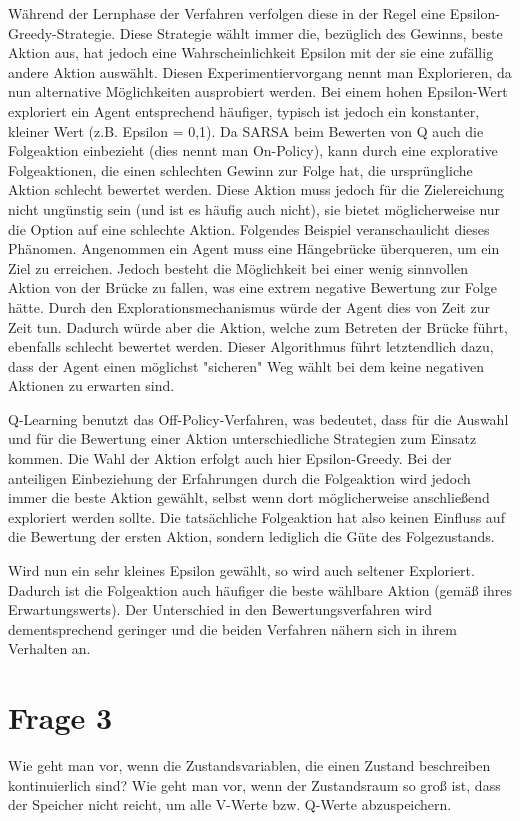 \documentclass[10pt]{scrartcl}
\begin{document}
Während der Lernphase der Verfahren verfolgen diese in der Regel eine Epsilon-Greedy-Strategie. Diese Strategie wählt immer die, bezüglich des Gewinns, beste Aktion aus, hat jedoch eine Wahrscheinlichkeit Epsilon mit der sie eine zufällig andere Aktion auswählt. Diesen Experimentiervorgang nennt man Explorieren, da nun alternative Möglichkeiten ausprobiert werden. Bei einem hohen Epsilon-Wert exploriert ein Agent entsprechend häufiger, typisch ist jedoch ein konstanter, kleiner Wert (z.B. Epsilon = 0,1).
Da SARSA beim Bewerten von Q auch die Folgeaktion einbezieht (dies nennt man On-Policy), kann durch eine explorative Folgeaktionen, die einen schlechten Gewinn zur Folge hat, die ursprüngliche Aktion schlecht bewertet werden. Diese Aktion muss jedoch für die Zielereichung nicht ungünstig sein (und ist es häufig auch nicht), sie bietet möglicherweise nur die Option auf eine schlechte Aktion. Folgendes Beispiel veranschaulicht dieses Phänomen. Angenommen ein Agent muss eine Hängebrücke überqueren, um ein Ziel zu erreichen. Jedoch besteht die Möglichkeit bei einer wenig sinnvollen Aktion von der Brücke zu fallen, was eine extrem negative Bewertung zur Folge hätte. Durch den Explorationsmechanismus würde der Agent dies von Zeit zur Zeit tun. Dadurch würde aber die Aktion, welche zum Betreten der Brücke führt, ebenfalls schlecht bewertet werden. Dieser Algorithmus führt letztendlich dazu, dass der Agent einen möglichst "sicheren" Weg wählt bei dem keine negativen Aktionen zu erwarten sind.

Q-Learning benutzt das Off-Policy-Verfahren, was bedeutet, dass für die Auswahl und für die Bewertung einer Aktion unterschiedliche Strategien zum Einsatz kommen. Die Wahl der Aktion erfolgt auch hier Epsilon-Greedy. Bei der anteiligen Einbeziehung der Erfahrungen durch die Folgeaktion wird jedoch immer die beste Aktion gewählt, selbst wenn dort möglicherweise anschließend exploriert werden sollte. Die tatsächliche Folgeaktion hat also keinen Einfluss auf die Bewertung der ersten Aktion, sondern lediglich die Güte des Folgezustands.

Wird nun ein sehr kleines Epsilon gewählt, so wird auch seltener Exploriert. Dadurch ist die Folgeaktion auch häufiger die beste wählbare Aktion (gemäß ihres Erwartungswerts). Der Unterschied in den Bewertungsverfahren wird dementsprechend geringer und die beiden Verfahren nähern sich in ihrem Verhalten an.

\section{Frage 3}
Wie geht man vor, wenn die Zustandsvariablen, die einen Zustand beschreiben kontinuierlich sind? Wie geht man vor, wenn der Zustandsraum so groß ist, dass der Speicher nicht reicht, um alle V-Werte bzw. Q-Werte abzuspeichern.
\end{document}
